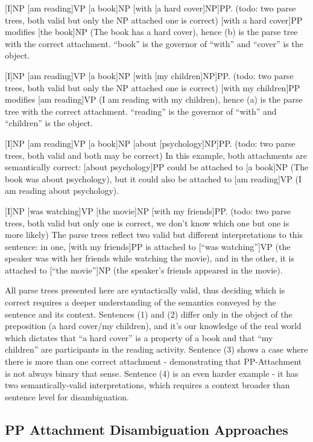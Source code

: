 [I]NP [am reading]VP [a book]NP [with [a hard cover]NP]PP.
(todo: two parse trees, both valid but only the NP attached one is correct)
[with a hard cover]PP modifies [the book]NP (The book has a hard cover), hence (b) is the parse tree with the correct attachment. “book” is the governor of “with” and “cover” is the object.


[I]NP [am reading]VP [a book]NP [with  [my children]NP]PP.
(todo: two parse trees, both valid but only the NP attached one is correct)
[with my children]PP modifies [am reading]VP (I am reading with my children), hence (a) is the parse tree with the correct attachment. “reading” is the governor of “with” and “children” is the object.


[I]NP [am reading]VP [a book]NP [about [psychology]NP]PP.
(todo: two parse trees, both valid and both may be correct)
In this example, both attachments are semantically correct: [about psychology]PP could be attached to [a book]NP (The book was about psychology), but it could also be attached to [am reading]VP (I am reading about psychology).


[I]NP [was watching]VP [the movie]NP [with my friends]PP. 
(todo: two parse trees, both valid but only one is correct, we don’t know which one but one is more likely)
The parse trees reflect two valid but different interpretations to this sentence: in one, [with my friends]PP is attached to [“was watching”]VP (the speaker was with her friends while watching the movie), and in the other, it is attached to [“the movie”]NP (the speaker’s friends appeared in the movie).
 

All parse trees presented here are syntactically valid, thus deciding which is correct requires a deeper understanding of the semantics conveyed by the sentence and its context.
Sentences (1) and (2) differ only in the object of the preposition (a hard cover/my children), and it’s our knowledge of the real world which dictates that “a hard cover” is a property of a book and that “my children” are participants in the reading activity. Sentence (3) shows a case where there is more than one correct attachment - demonstrating that PP-Attachment is not always binary that sense. Sentence (4) is an even harder example - it has two semantically-valid interpretations, which requires a context broader than sentence level for disambiguation.  
\subsection{PP Attachment Disambiguation Approaches}

